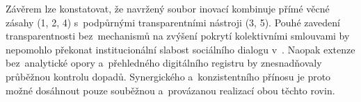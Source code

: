 Závěrem lze konstatovat, že navržený soubor inovací kombinuje přímé věcné zásahy (1, 2, 4) s~podpůrnými transparentními nástroji (3, 5). Pouhé zavedení transparentnosti bez~mechanismů na zvýšení pokrytí kolektivními smlouvami by nepomohlo překonat institucionální slabost sociálního dialogu v~. Naopak extenze bez~analytické opory a~přehledného digitálního registru by znesnadňovaly průběžnou kontrolu dopadů. Synergického a~konzistentního přínosu je proto možné dosáhnout pouze souběžnou a~provázanou realizací obou těchto rovin.\par
